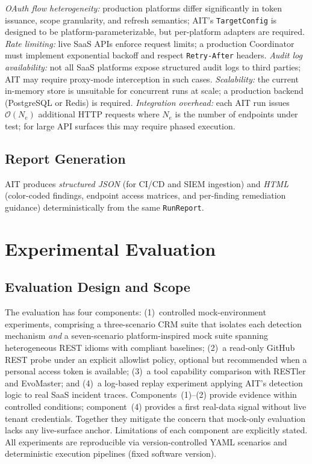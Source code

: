 \documentclass[conference]{IEEEtran}
\begin{document}
\emph{OAuth flow heterogeneity:} production platforms
differ significantly in token issuance, scope granularity, and
refresh semantics; AIT's \texttt{TargetConfig} is designed to be
platform-parameterizable, but per-platform adapters are required.
\emph{Rate limiting:} live SaaS APIs enforce request limits; a
production Coordinator must implement exponential backoff and
respect \texttt{Retry-After} headers. \emph{Audit log availability:}
not all SaaS platforms expose structured audit logs to third parties;
AIT may require proxy-mode interception in such cases.
\emph{Scalability:} the current in-memory store is unsuitable for
concurrent runs at scale; a production backend (PostgreSQL or Redis)
is required. \emph{Integration overhead:} each AIT run issues
$\mathcal{O}(N_e)$ additional HTTP requests where $N_e$ is the
number of endpoints under test; for large API surfaces this may
require phased execution.

\subsection{Report Generation}

AIT produces \emph{structured JSON} (for CI/CD and SIEM ingestion)
and \emph{HTML} (color-coded findings, endpoint access matrices, and
per-finding remediation guidance) deterministically from the same
\texttt{RunReport}.

\section{Experimental Evaluation}
\label{sec:eval}

\subsection{Evaluation Design and Scope}
\label{sec:evalscope}

The evaluation has four components: (1)~controlled mock-environment
experiments, comprising a three-scenario CRM suite that isolates each
detection mechanism \emph{and} a seven-scenario platform-inspired mock
suite spanning heterogeneous REST idioms with compliant baselines;
(2)~a read-only GitHub REST probe under an explicit allowlist policy,
optional but recommended when a personal access token is available;
(3)~a tool capability comparison with RESTler and EvoMaster; and
(4)~a log-based replay experiment applying AIT's detection logic to real
SaaS incident traces. Components~(1)--(2) provide evidence within controlled
conditions; component~(4) provides a first real-data signal without live
tenant credentials. Together they mitigate the concern that mock-only
evaluation lacks any live-surface anchor. Limitations of each component are
explicitly stated.
All experiments are reproducible via version-controlled YAML scenarios
and deterministic execution pipelines (fixed software version).
\end{document}
